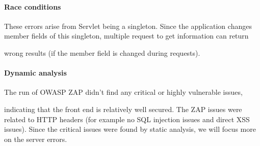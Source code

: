 \documentclass{article}
\begin{document}
\paragraph{Race conditions}
These errors arise from Servlet being a singleton. Since the application changes
member fields of this singleton, multiple request to get information can return


wrong results (if the member field is changed during requests). 

\paragraph{Dynamic analysis}
The run of OWASP ZAP didn't find any critical or highly vulnerable issues,

indicating that the front end is relatively well secured. The ZAP issues were
related to HTTP headers (for example no SQL injection issues and direct XSS
issues). Since the critical issues were found by static analysis, we will focus
more on the server errors.

\end{document}
